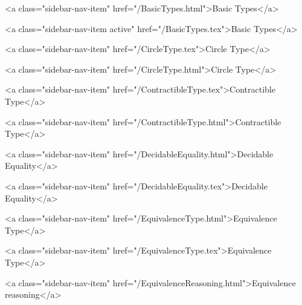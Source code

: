       
    
      
        
          <a class="sidebar-nav-item" href="/BasicTypes.html">Basic Types</a>
        
      
    
      
        
          <a class="sidebar-nav-item active" href="/BasicTypes.tex">Basic Types</a>
        
      
    
      
        
          <a class="sidebar-nav-item" href="/CircleType.tex">Circle Type</a>
        
      
    
      
        
          <a class="sidebar-nav-item" href="/CircleType.html">Circle Type</a>
        
      
    
      
        
          <a class="sidebar-nav-item" href="/ContractibleType.tex">Contractible Type</a>
        
      
    
      
        
          <a class="sidebar-nav-item" href="/ContractibleType.html">Contractible Type</a>
        
      
    
      
        
          <a class="sidebar-nav-item" href="/DecidableEquality.html">Decidable Equality</a>
        
      
    
      
        
          <a class="sidebar-nav-item" href="/DecidableEquality.tex">Decidable Equality</a>
        
      
    
      
        
          <a class="sidebar-nav-item" href="/EquivalenceType.html">Equivalence Type</a>
        
      
    
      
        
          <a class="sidebar-nav-item" href="/EquivalenceType.tex">Equivalence Type</a>
        
      
    
      
        
          <a class="sidebar-nav-item" href="/EquivalenceReasoning.html">Equivalence reasoning</a>
        
